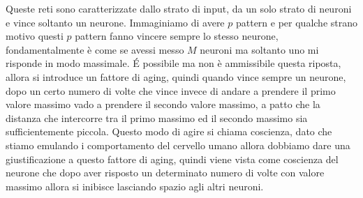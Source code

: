 \noindent Queste reti sono caratterizzate dallo strato di input, da un solo strato di neuroni e vince soltanto un neurone. Immaginiamo di avere $p$ pattern e per qualche strano motivo questi $p$ pattern fanno vincere sempre lo stesso neurone, fondamentalmente è come se avessi messo $M$ neuroni ma soltanto uno mi risponde in modo massimale. \'E possibile ma non è ammissibile questa riposta, allora si introduce un fattore di aging, quindi quando vince sempre un neurone, dopo un certo numero di volte che vince invece di andare a prendere il primo valore massimo vado a prendere il secondo valore massimo, a patto che la distanza che intercorre tra il primo massimo ed il secondo massimo sia sufficientemente piccola. Questo modo di agire si chiama coscienza, dato che stiamo emulando i comportamento del cervello umano allora dobbiamo dare una giustificazione a questo fattore di aging, quindi viene vista come coscienza del neurone che dopo aver risposto un determinato numero di volte con valore massimo allora si inibisce lasciando spazio agli altri neuroni.\\

